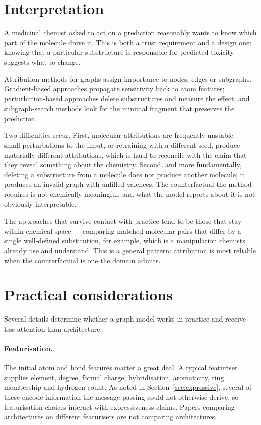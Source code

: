 \documentclass[11pt,a4paper]{article}
\begin{document}
\section{Interpretation}
\label{sec:interpretation}

A medicinal chemist asked to act on a prediction reasonably wants to know
which part of the molecule drove it. This is both a trust requirement and a
design one: knowing that a particular substructure is responsible for
predicted toxicity suggests what to change.

Attribution methods for graphs assign importance to nodes, edges or
subgraphs. Gradient-based approaches propagate sensitivity back to atom
features; perturbation-based approaches delete substructures and measure the
effect; and subgraph-search methods look for the minimal fragment that
preserves the prediction.

Two difficulties recur. First, molecular attributions are frequently unstable
--- small perturbations to the input, or retraining with a different seed,
produce materially different attributions, which is hard to reconcile with the
claim that they reveal something about the chemistry. Second, and more
fundamentally, deleting a substructure from a molecule does not produce
another molecule; it produces an invalid graph with unfilled valences. The
counterfactual the method requires is not chemically meaningful, and what the
model reports about it is not obviously interpretable.

The approaches that survive contact with practice tend to be those that stay
within chemical space --- comparing matched molecular pairs that differ by a
single well-defined substitution, for example, which is a manipulation
chemists already use and understand. This is a general pattern: attribution is
most reliable when the counterfactual is one the domain admits.

\section{Practical considerations}
\label{sec:practical}

Several details determine whether a graph model works in practice and receive
less attention than architecture.

\paragraph{Featurisation.}
The initial atom and bond features matter a great deal. A typical featuriser
supplies element, degree, formal charge, hybridisation, aromaticity, ring
membership and hydrogen count. As noted in Section~\ref{sec:expressive},
several of these encode information the message passing could not otherwise
derive, so featurisation choices interact with expressiveness claims. Papers
comparing architectures on different featurisers are not comparing
architectures.
\end{document}
